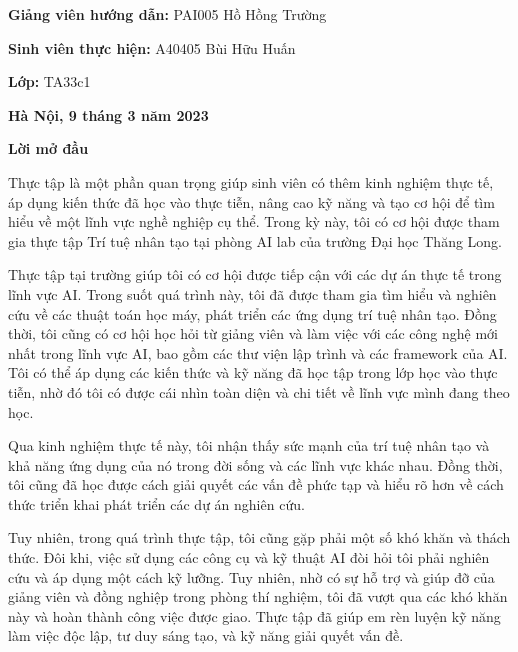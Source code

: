 \documentclass{article}
\begin{document}
\vspace{2cm}

{\bfseries Giảng viên hướng dẫn:} PAI005 Hồ Hồng Trường \par
{\bfseries Sinh viên thực hiện:} A40405 Bùi Hữu Huấn \par
{\bfseries Lớp:} TA33c1 \par 

\vspace{2cm}

{\bfseries Hà Nội, 9 tháng 3 năm 2023}
\newpage
\ClearShipoutPictureBG

\noindent \textbf{\Large Lời mở đầu}

\noindent

\vspace{1cm}

\noindent Thực tập là một phần quan trọng giúp sinh viên có thêm kinh nghiệm thực tế, áp dụng kiến thức đã học vào thực tiễn, nâng cao kỹ năng và tạo cơ hội để tìm hiểu về một lĩnh vực nghề nghiệp cụ thể. Trong kỳ này, tôi có cơ hội được tham gia thực tập Trí tuệ nhân tạo tại phòng AI lab của trường Đại học Thăng Long.

\vspace{0.5cm}

\noindent Thực tập tại trường giúp tôi có cơ hội được tiếp cận với các dự án thực tế trong lĩnh vực AI. Trong suốt quá trình này, tôi đã được tham gia tìm hiểu và nghiên cứu về các thuật toán học máy, phát triển các ứng dụng trí tuệ nhân tạo. Đồng thời, tôi cũng có cơ hội học hỏi từ giảng viên và làm việc với các công nghệ mới nhất trong lĩnh vực AI, bao gồm các thư viện lập trình và các framework của AI. Tôi có thể áp dụng các kiến thức và kỹ năng đã học tập trong lớp học vào thực tiễn, nhờ đó tôi có được cái nhìn toàn diện và chi tiết về lĩnh vực mình đang theo học.

\vspace{0.5cm}

\noindent Qua kinh nghiệm thực tế này, tôi nhận thấy sức mạnh của trí tuệ nhân tạo và khả năng ứng dụng của nó trong đời sống và các lĩnh vực khác nhau. Đồng thời, tôi cũng đã học được cách giải quyết các vấn đề phức tạp và hiểu rõ hơn về cách thức triển khai phát triển các dự án nghiên cứu.

\vspace{0.5cm}

\noindent Tuy nhiên, trong quá trình thực tập, tôi cũng gặp phải một số khó khăn và thách thức. Đôi khi, việc sử dụng các công cụ và kỹ thuật AI đòi hỏi tôi phải nghiên cứu và áp dụng một cách kỹ lưỡng. Tuy nhiên, nhờ có sự hỗ trợ và giúp đỡ của giảng viên và đồng nghiệp trong phòng thí nghiệm, tôi đã vượt qua các khó khăn này và hoàn thành công việc được giao. Thực tập đã giúp em rèn luyện kỹ năng làm việc độc lập, tư duy sáng tạo, và kỹ năng giải quyết vấn đề.
\end{document}
